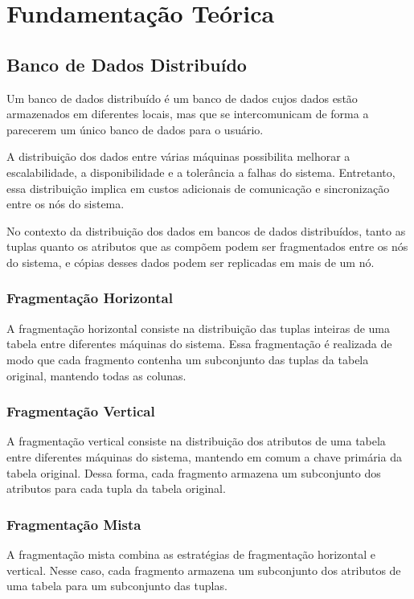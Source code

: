 \section{Fundamentação Teórica}
\subsection{Banco de Dados Distribuído}
Um banco de dados distribuído é um banco de dados cujos dados estão armazenados em diferentes locais, mas que se intercomunicam de forma a parecerem um único banco de dados para o usuário.

A distribuição dos dados entre várias máquinas possibilita melhorar a escalabilidade, a disponibilidade e a tolerância a falhas do sistema. Entretanto, essa distribuição implica em custos adicionais de comunicação e sincronização entre os nós do sistema.

No contexto da distribuição dos dados em bancos de dados distribuídos, tanto as tuplas quanto os atributos que as compõem podem ser fragmentados entre os nós do sistema, e cópias desses dados podem ser replicadas em mais de um nó.

\subsubsection{Fragmentação Horizontal}
A fragmentação horizontal consiste na distribuição das tuplas inteiras de uma tabela entre diferentes máquinas do sistema. Essa fragmentação é realizada de modo que cada fragmento contenha um subconjunto das tuplas da tabela original, mantendo todas as colunas.

\subsubsection{Fragmentação Vertical}
A fragmentação vertical consiste na distribuição dos atributos de uma tabela entre diferentes máquinas do sistema, mantendo em comum a chave primária da tabela original. Dessa forma, cada fragmento armazena um subconjunto dos atributos para cada tupla da tabela original.

\subsubsection{Fragmentação Mista}
A fragmentação mista combina as estratégias de fragmentação horizontal e vertical. Nesse caso, cada fragmento armazena um subconjunto dos atributos de uma tabela para um subconjunto das tuplas.

